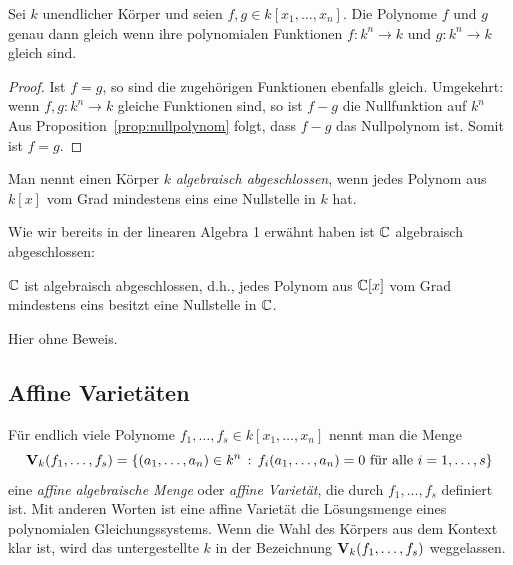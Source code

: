 \documentclass[11pt]{article}
\numberwithin{equation}{section}
\begin{document}
\begin{corollary} 
	Sei $k$ unendlicher Körper und seien $f,g \in k[x_1,\ldots,x_n]$. Die Polynome $f$ und $g$ genau dann gleich  wenn ihre polynomialen Funktionen $ f: k^n \to k$ und $g : k^n \to k$ gleich sind. 
\end{corollary} 
\begin{proof}
	Ist $f =g$, so sind die zugehörigen Funktionen ebenfalls gleich. Umgekehrt: wenn $f , g: k^n \to k$ gleiche Funktionen sind, so ist $  f-g$ die Nullfunktion auf $k^n$
	Aus Proposition~\ref{prop:nullpolynom} folgt, dass $f - g$ das Nullpolynom ist. Somit ist $f=g$. 
\end{proof} 

\begin{definition} 
Man nennt einen Körper $k$ \emph{algebraisch abgeschlossen}, wenn jedes Polynom aus $k[x]$ vom Grad mindestens eins eine Nullstelle in $k$ hat. 
\end{definition} 

Wie wir bereits in der linearen Algebra 1 erwähnt haben  ist $\mathbb{C}$ algebraisch abgeschlossen: 

\begin{theorem} 
	$\mathbb{C}$ ist algebraisch abgeschlossen, d.h., jedes Polynom aus $\mathbb{C}[x]$ vom Grad mindestens eins besitzt eine Nullstelle in $\mathbb{C}$. 
\end{theorem} 

Hier ohne Beweis. 



\subsection{Affine Varietäten} 

\begin{definition} 
	Für endlich viele Polynome $f_1,\ldots,f_s \in k[x_1,\ldots,x_n]$ nennt man die Menge
	\[
		\mathbf{V}_k(f_1,\ldots,f_s) = \left\{ (a_1,\ldots,a_n) \in k^n \,:\, f_i(a_1,\ldots,a_n) = 0 \  \text{für alle} \  i=1,\ldots,s \right\} 
	\]
	eine \emph{affine algebraische Menge} oder \emph{affine Varietät}, die durch $f_1,\ldots,f_s$ definiert ist. Mit anderen Worten ist eine affine Varietät die Lösungsmenge eines polynomialen Gleichungssystems. Wenn die Wahl des Körpers aus dem Kontext klar ist, wird das untergestellte $k$ in der Bezeichnung $\mathbf{V}_k(f_1,\dots,f_s)$ weggelassen. 
\end{definition} 
\end{document}
